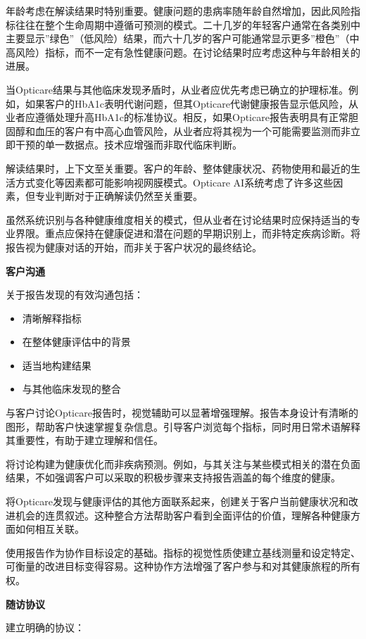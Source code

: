 \documentclass[
  Letterpaper,
]{scrbook}
\providecommand{\tightlist}{%
  \setlength{\itemsep}{0pt}\setlength{\parskip}{0pt}}\usepackage{longtable,booktabs,array}
\begin{document}
年龄考虑在解读结果时特别重要。健康问题的患病率随年龄自然增加，因此风险指标往往在整个生命周期中遵循可预测的模式。二十几岁的年轻客户通常在各类别中主要显示''绿色''（低风险）结果，而六十几岁的客户可能通常显示更多''橙色''（中高风险）指标，而不一定有急性健康问题。在讨论结果时应考虑这种与年龄相关的进展。

当Opticare结果与其他临床发现矛盾时，从业者应优先考虑已确立的护理标准。例如，如果客户的HbA1c表明代谢问题，但其Opticare代谢健康报告显示低风险，从业者应遵循处理升高HbA1c的标准协议。相反，如果Opticare报告表明具有正常胆固醇和血压的客户有中高心血管风险，从业者应将其视为一个可能需要监测而非立即干预的单一数据点。技术应增强而非取代临床判断。

解读结果时，上下文至关重要。客户的年龄、整体健康状况、药物使用和最近的生活方式变化等因素都可能影响视网膜模式。Opticare
AI系统考虑了许多这些因素，但专业判断对于正确解读仍然至关重要。

虽然系统识别与各种健康维度相关的模式，但从业者在讨论结果时应保持适当的专业界限。重点应保持在健康促进和潜在问题的早期识别上，而非特定疾病诊断。将报告视为健康对话的开始，而非关于客户状况的最终结论。

\textbf{客户沟通}

关于报告发现的有效沟通包括：

\begin{itemize}
\tightlist
\item
  清晰解释指标
\item
  在整体健康评估中的背景
\item
  适当地构建结果
\item
  与其他临床发现的整合
\end{itemize}

与客户讨论Opticare报告时，视觉辅助可以显著增强理解。报告本身设计有清晰的图形，帮助客户快速掌握复杂信息。引导客户浏览每个指标，同时用日常术语解释其重要性，有助于建立理解和信任。

将讨论构建为健康优化而非疾病预测。例如，与其关注与某些模式相关的潜在负面结果，不如强调客户可以采取的积极步骤来支持报告涵盖的每个维度的健康。

将Opticare发现与健康评估的其他方面联系起来，创建关于客户当前健康状况和改进机会的连贯叙述。这种整合方法帮助客户看到全面评估的价值，理解各种健康方面如何相互关联。

使用报告作为协作目标设定的基础。指标的视觉性质使建立基线测量和设定特定、可衡量的改进目标变得容易。这种协作方法增强了客户参与和对其健康旅程的所有权。

\textbf{随访协议}

建立明确的协议：
\end{document}
